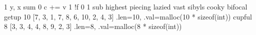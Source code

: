 \expandafter\def\csname cpp:swap\endcsname{1}
\expandafter\def\csname cpp:PARAM(x,y)\endcsname{y, x}
\expandafter\def\csname cpp:comp\endcsname{sum}
\expandafter\def\csname cpp:INIT\endcsname{0}
\expandafter\def\csname cpp:PROCESS(c,v)\endcsname{c += v}
\expandafter\def\csname cpp:NOT\endcsname{1}
\expandafter\def\csname cpp:COND(f,c,v)\endcsname{!f}
\expandafter\def\csname cpp:FALSE\endcsname{0}
\expandafter\def\csname cpp:TRUE\endcsname{1}
\expandafter\def\csname cpp:join\endcsname{sub}
\expandafter\def\csname cpp:FORALLIN\endcsname{highest}
\expandafter\def\csname cpp:A\endcsname{piecing}
\expandafter\def\csname cpp:B\endcsname{lazied}
\expandafter\def\csname cpp:C\endcsname{vast}
\expandafter\def\csname cpp:I\endcsname{sibyls}
\expandafter\def\csname cpp:J\endcsname{cooky}
\expandafter\def\csname cpp:F\endcsname{bifocal}
\expandafter\def\csname cpp:U\endcsname{getup}
\expandafter\def\csname cpp:TABU_LEN\endcsname{10}
\expandafter\def\csname cpp:TABU_VAL\endcsname{[7, 3, 1, 7, 8, 6, 10, 2, 4, 3]}
\expandafter\def\csname cpp:TABU\endcsname{{.len=10, .val=malloc(10 * sizeof(int))}}
\expandafter\def\csname cpp:V\endcsname{cupful}
\expandafter\def\csname cpp:TABV_LEN\endcsname{8}
\expandafter\def\csname cpp:TABV_VAL\endcsname{[3, 3, 4, 4, 8, 9, 2, 3]}
\expandafter\def\csname cpp:TABV\endcsname{{.len=8, .val=malloc(8 * sizeof(int))}}

\def\C#1{\csname cpp:#1\endcsname}

